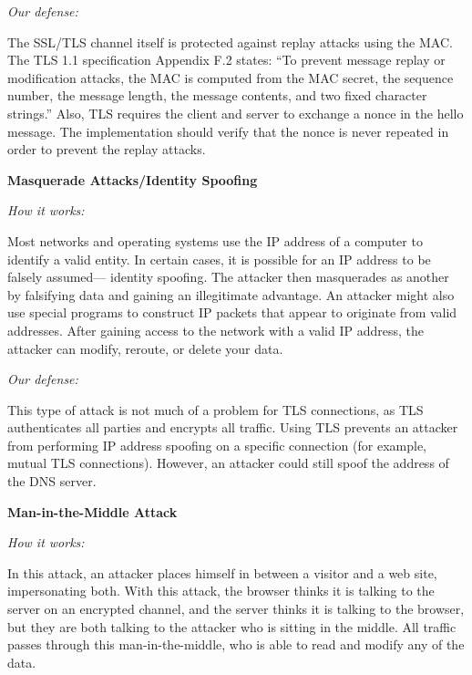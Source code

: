 \documentclass[a4paper,twoside,10pt]{report}
\begin{document}
\vspace{2.5mm}
\noindent
\textit{Our defense: }

The SSL/TLS channel itself is protected against replay attacks using the MAC. The TLS 1.1 specification Appendix F.2 states: "`To prevent message replay or modification attacks, the MAC is computed from the MAC secret, the sequence number, the message length, the message contents, and two fixed character strings."' Also, TLS requires the client and server to exchange a nonce in the hello message. The implementation should verify that the nonce is never repeated in order to prevent the replay attacks.

\vspace{2.5mm}
\noindent
{\large\textbf{Masquerade Attacks/Identity Spoofing}}

\vspace{1mm}
\noindent
\textit{How it works: }

Most networks and operating systems use the IP address of a computer to identify a valid entity. In certain cases, it is possible for an IP address to be falsely assumed— identity spoofing. The attacker then masquerades as another by falsifying data and gaining an illegitimate advantage. An attacker might also use special programs to construct IP packets that appear to originate from valid addresses. After gaining access to the network with a valid IP address, the attacker can modify, reroute, or delete your data.

\vspace{2.5mm}
\noindent
\textit{Our defense: }

This type of attack is not much of a problem for TLS connections, as TLS authenticates all parties and encrypts all traffic. Using TLS prevents an attacker from performing IP address spoofing on a specific connection (for example, mutual TLS connections). However, an attacker could still spoof the address of the DNS server.

\vspace{2.5mm}
\noindent
{\large\textbf{Man-in-the-Middle Attack}}

\vspace{1mm}
\noindent
\textit{How it works: }

In this attack, an attacker places himself in between a visitor and a web site, impersonating both. With this attack, the browser thinks it is talking to the server on an encrypted channel, and the server thinks it is talking to the browser, but they are both talking to the attacker who is sitting in the middle. All traffic passes through this man-in-the-middle, who is able to read and modify any of the data.
\end{document}
